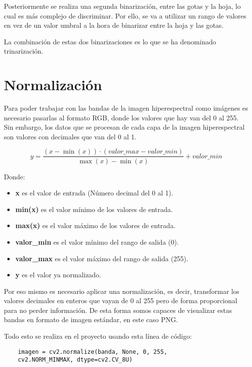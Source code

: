 
Posteriormente se realiza una segunda binarización, entre las gotas y la hoja, lo cual es más complejo de discriminar. Por ello, se va a utilizar un rango de valores en vez de un valor umbral a la hora de binarizar entre la hoja y las gotas.

La combinación de estas dos binarizaciones es lo que se ha denominado trinarización.

\section{Normalización}
Para poder trabajar con las bandas de la imagen hiperespectral como imágenes es necesario pasarlas al formato RGB, donde los valores que hay van del 0 al 255. Sin embargo, los datos que se procesan de cada capa de la imagen hiperespectral son valores con decimales que van del 0 al 1.


$$y = \frac{(x - \min(x)) \cdot (valor\_max - valor\_min)}{\max(x) - \min(x)} + valor\_min$$ 

Donde:
\begin{itemize}
    \item \textbf{x} es el valor de entrada (Número decimal del 0 al 1).
    \item \textbf{min(x)} es el valor mínimo de los valores de entrada.
    \item \textbf{max(x)} es el valor máximo de los valores de entrada.
    \item \textbf{valor\_min} es el valor mínimo del rango de salida (0).
    \item \textbf{valor\_max} es el valor máximo del rango de salida (255).
    \item \textbf{y} es el valor ya normalizado.
\end{itemize}

 Por eso mismo es necesario aplicar una normalización, es decir, transformar los valores decimales en enteros que vayan de 0 al 255 pero de forma proporcional para no perder información. De esta forma somos capaces de visualizar estas bandas en formato de imagen estándar, en este caso PNG.

 Todo esto se realiza en el proyecto usando esta línea de código:
 \begin{verbatim}
    imagen = cv2.normalize(banda, None, 0, 255, 
    cv2.NORM_MINMAX, dtype=cv2.CV_8U)
 \end{verbatim}

